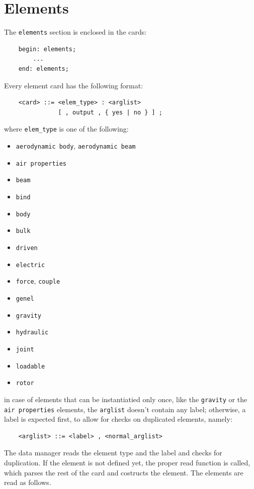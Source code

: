 \documentclass[10pt,dvips]{report}
\begin{document}
\chapter{Elements}
The {\tt elements} section is enclosed in the cards:
\begin{verbatim}
    begin: elements;
        ...
    end: elements;
\end{verbatim}
Every element card has the following format:
\begin{verbatim}
    <card> ::= <elem_type> : <arglist>
               [ , output , { yes | no } ] ;
\end{verbatim}
where {\tt elem\_type} is one of the following:
\begin{itemize}
  \item {\tt aerodynamic body}, {\tt aerodynamic beam}
  \item {\tt air properties}
  \item {\tt beam}
  \item {\tt bind}
  \item {\tt body}
  \item {\tt bulk}
  \item {\tt driven}
  \item {\tt electric}
  \item {\tt force}, {\tt couple}
  \item {\tt genel}
  \item {\tt gravity}
  \item {\tt hydraulic}
  \item {\tt joint}
  \item {\tt loadable}
  \item {\tt rotor}
\end{itemize}
in case of elements that can be instantiatied only once, like
the {\tt gravity} or the {\tt air properties} elements, the {\tt arglist}
doesn't contain any label; otherwise, a label is expected first, to allow 
for checks on duplicated elements, namely: 
\begin{verbatim}
    <arglist> ::= <label> , <normal_arglist>
\end{verbatim}
The data manager reads the element type and the label and checks for
duplication. If the element is not defined yet, the proper read function is
called, which parses the rest of the card and costructs the element.
The elements are read as follows.
\end{document}

